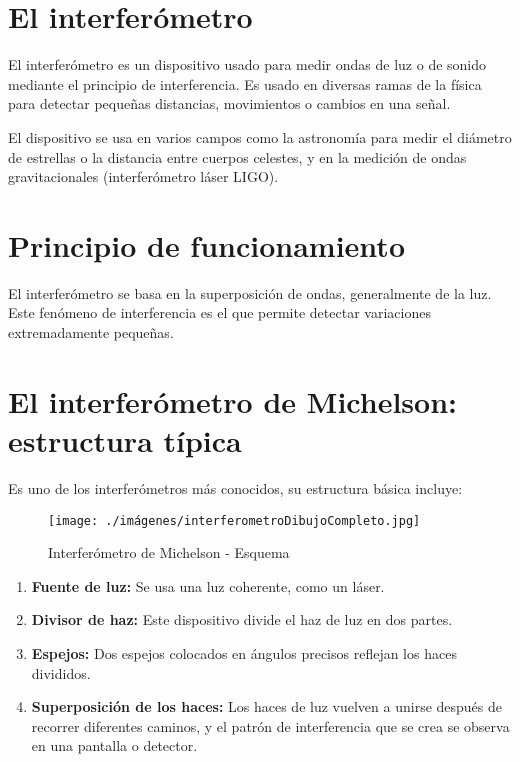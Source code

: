 \documentclass[a4paper, 12pt]{article}
\begin{document}
	
	\section{\textbf{El interferómetro}}

	\indent El interferómetro es un dispositivo usado para medir ondas de luz o de sonido mediante el principio de interferencia. Es usado en diversas ramas de la física para detectar pequeñas distancias, movimientos o cambios en una señal.
	
	\indent El dispositivo se usa en varios campos como la astronomía para medir el diámetro de estrellas o la distancia entre cuerpos celestes, y en la medición de ondas gravitacionales (interferómetro láser LIGO).
	
	\section {\textbf{Principio de funcionamiento}}

	\indent El interferómetro se basa en la superposición de ondas, generalmente de la luz. Este fenómeno de interferencia es el que permite detectar variaciones extremadamente pequeñas.
	
	\section{\textbf{El interferómetro de Michelson: estructura típica}}
	
	\indent Es uno de los interferómetros más conocidos, su estructura básica incluye: 
	
	\begin{figure}[h!]
		\centering
		\texttt{[image: ./imágenes/interferometroDibujoCompleto.jpg]}
		\caption{Interferómetro de Michelson - Esquema}
		\label{fig:interferometro2}
	\end{figure}
	
	\begin{enumerate}
		\item \textbf{Fuente de luz:} Se usa una luz coherente, como un láser.
		\item \textbf{Divisor de haz:} Este dispositivo divide el haz de luz en dos partes.
		\item \textbf{Espejos:} Dos espejos colocados en ángulos precisos reflejan los haces divididos.
		\item \textbf{Superposición de los haces:} Los haces de luz vuelven a unirse después de recorrer diferentes caminos, y el patrón de interferencia que se crea se observa en una pantalla o detector.
	\end{enumerate}
	\newpage
\end{document}
